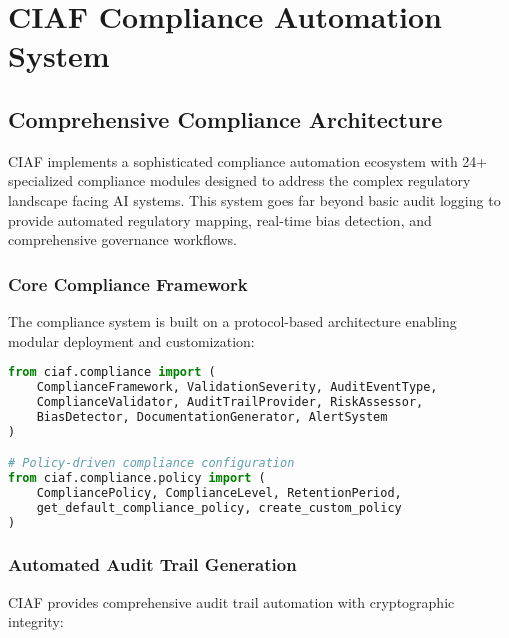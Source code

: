 \documentclass[12pt,a4paper]{article}
\begin{document}
\section{CIAF Compliance Automation System}

\subsection{Comprehensive Compliance Architecture}

CIAF implements a sophisticated compliance automation ecosystem with 24+ specialized compliance modules designed to address the complex regulatory landscape facing AI systems. This system goes far beyond basic audit logging to provide automated regulatory mapping, real-time bias detection, and comprehensive governance workflows.

\subsubsection{Core Compliance Framework}

The compliance system is built on a protocol-based architecture enabling modular deployment and customization:

\begin{lstlisting}[language=Python, caption=Core Compliance Interfaces]
from ciaf.compliance import (
    ComplianceFramework, ValidationSeverity, AuditEventType,
    ComplianceValidator, AuditTrailProvider, RiskAssessor,
    BiasDetector, DocumentationGenerator, AlertSystem
)

# Policy-driven compliance configuration
from ciaf.compliance.policy import (
    CompliancePolicy, ComplianceLevel, RetentionPeriod,
    get_default_compliance_policy, create_custom_policy
)
\end{lstlisting}

\subsubsection{Automated Audit Trail Generation}

CIAF provides comprehensive audit trail automation with cryptographic integrity:
\end{document}
